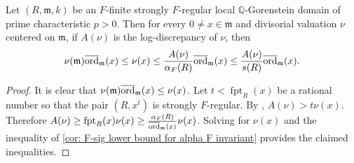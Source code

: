 \documentclass[12pt]{amsart}
\numberwithin{equation}{theorem}
\theoremstyle{plain}
\newcommand{\fm}{\mathfrak{m}}
\newcommand{\QQ}{\mathbb{Q}}
\DeclareMathOperator{\FPT}{fpt}
\begin{document}

\begin{corollary}
    \label{cor: discrepancy bound}
    Let $(R,\fm,k)$ be an $F$-finite strongly $F$-regular local $\QQ$-Gorenstein domain of prime characteristic $p>0$. Then for every $0\not=x \in \fm$ and divisorial valuation $\nu$ centered on $\fm$, if $A(\nu)$ is the log-discrepancy of $\nu$, then
    \[
    \nu(\fm)\overline{\ord}_{\fm}(x) \leq \nu(x)\leq \frac{A(\nu)}{\alpha_F(R)}\overline{\ord}_{\fm}(x)  \leq \frac{A(\nu)}{s(R)}\overline{\ord}_{\fm}(x).
    \]
\end{corollary}
\begin{proof}
    It is clear that $\nu(\fm)\overline{\ord}_{\fm}(x)\leq \nu(x)$. Let $t<\FPT_R(x)$ be a rational number so that the pair $(R,x^t)$ is strongly $F$-regular. By \cite[Theorem~3.3]{HaraWatanabe2002}, $A(\nu)>t\nu(x)$. Therefore $A(\nu)\geq \fpt_R(x)\nu(x)\geq \frac{\alpha_F(R)}{\overline{\ord}_{\fm}(x)}\nu(x)$. Solving for $\nu(x)$ and the inequality of \cref{cor: F-sig lower bound for alpha F invariant} provides the claimed inequalities.
\end{proof}
\end{document}
